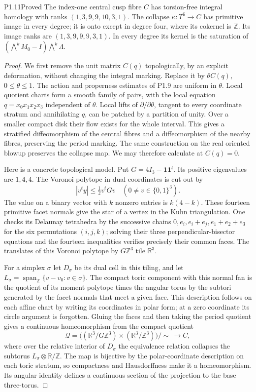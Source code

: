 \begin{statement}{P1.11}{Proved}
The index-one central cusp fibre $C$ has torsion-free integral homology
with ranks $(1,3,9,9,10,3,1)$.
The collapse $\kappa:T^6\to C$ has primitive image in every degree;
it is onto except in degree four, where its cokernel is $\mathbb Z$.
Its image ranks are $(1,3,9,9,9,3,1)$.
In every degree its kernel is the saturation of
$(\bigwedge^kM_0-I)\bigwedge^k\Lambda$.
\end{statement}
\begin{proof}
We first remove the unit matrix $C(q)$ topologically, by an explicit
deformation, without changing the integral marking.  Replace it by
$\theta C(q)$, $0\leq\theta\leq1$.  The action and properness estimates
of P1.9 are uniform in $\theta$.  Local quotient charts form a smooth
family of pairs, with the local equation $q=x_0x_1x_2x_3$ independent
of $\theta$.  Local lifts of $\partial/\partial\theta$, tangent to every
coordinate stratum and annihilating $q$, can be patched by a partition
of unity.  Over a smaller compact disk their flow exists for the whole
interval.  This gives a stratified diffeomorphism of the central
fibres and a diffeomorphism of the nearby fibres, preserving the
period marking.  The same construction on the real oriented blowup
preserves the collapse map.  We may therefore calculate at $C(q)=0$.

Here is a concrete topological model.  Put $G=4I_3-\mathbf1\mathbf1^t$.
Its positive eigenvalues are $1,4,4$.  The Voronoi polytope in dual
coordinates is cut out by
\[
|v^ty|\leq \tfrac12v^tGv
 \quad (0\ne v\in\{0,1\}^3).
\]
The value on a binary vector with $k$ nonzero entries is $k(4-k)$.
These fourteen primitive facet normals give the star of a vertex in
the Kuhn triangulation.  One checks its Delaunay tetrahedra by the
successive chains
$0,e_i,e_i+e_j,e_1+e_2+e_3$ for the six permutations $(i,j,k)$;
solving their three perpendicular-bisector equations and the fourteen
inequalities verifies precisely their common faces.  The translates
of this Voronoi polytope by $G\mathbb Z^3$ tile $\mathbb R^3$.

For a simplex $\sigma$ let $D_\sigma$ be its dual cell in this tiling,
and let
$L_\sigma=\operatorname{span}_{\mathbb Z}\{v-v_0:v\in\sigma\}$.
The compact toric component with this normal fan is the quotient of
its moment polytope times the angular torus by the subtori generated
by the facet normals that meet a given face.  This description follows
on each affine chart by writing its coordinates in polar form;
at a zero coordinate its circle argument is forgotten.  Gluing the
faces and then taking the period quotient gives a continuous
homeomorphism from the compact quotient
\[
\mathcal Q=
\bigl((\mathbb R^3/G\mathbb Z^3)\times
       (\mathbb R^3/\mathbb Z^3)\bigr)/\!\sim\ \longrightarrow C,
\]
where over the relative interior of $D_\sigma$ the equivalence
relation collapses the subtorus $L_\sigma\otimes\mathbb R/\mathbb Z$.
The map is bijective by the polar-coordinate description on each
toric stratum, so compactness and Hausdorffness make it a homeomorphism.
Its angular identity defines a continuous section of the projection to
the base three-torus.


\end{proof}
